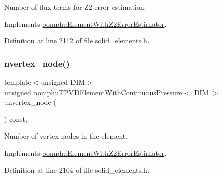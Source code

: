 Number of \textquotesingle{}flux\textquotesingle{} terms for Z2 error estimation. 



Implements \hyperlink{classoomph_1_1ElementWithZ2ErrorEstimator_ae82c5728902e13da31be19c390fc28e3}{oomph\+::\+Element\+With\+Z2\+Error\+Estimator}.



Definition at line 2112 of file solid\+\_\+elements.\+h.

\mbox{\label{classoomph_1_1TPVDElementWithContinuousPressure_a3be09b442e13efa2e91f936e59034670}} 
\subsubsection{\texorpdfstring{nvertex\+\_\+node()}{nvertex\_node()}}
{\footnotesize\ttfamily template$<$unsigned D\+IM$>$ \\
unsigned \hyperlink{classoomph_1_1TPVDElementWithContinuousPressure}{oomph\+::\+T\+P\+V\+D\+Element\+With\+Continuous\+Pressure}$<$ D\+IM $>$\+::nvertex\+\_\+node (\begin{DoxyParamCaption}{ }\end{DoxyParamCaption}) const\hspace{0.3cm}{\ttfamily [inline]}, {\ttfamily [virtual]}}



Number of vertex nodes in the element. 



Implements \hyperlink{classoomph_1_1ElementWithZ2ErrorEstimator_a19495a0e77ef4ff35f15fdf7913b4077}{oomph\+::\+Element\+With\+Z2\+Error\+Estimator}.



Definition at line 2104 of file solid\+\_\+elements.\+h.

\mbox{\label{classoomph_1_1TPVDElementWithContinuousPressure_a33bc9dab61e60a0de1cb784020c5f056}} 
